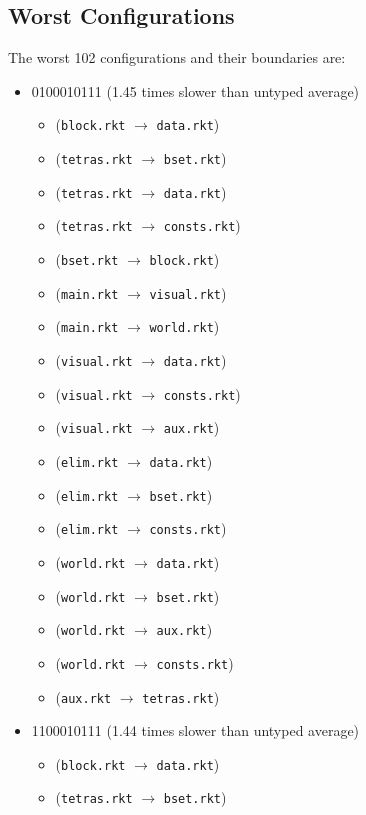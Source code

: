 \documentclass{article}
\newcommand{\mono}[1]{\texttt{#1}}
\begin{document}
\subsection{Worst Configurations}
The worst 102 configurations and their boundaries are:
\begin{itemize}
\item 0100010111 (1.45 times slower than untyped average)
  \begin{itemize}
  \item (\mono{block.rkt} $\rightarrow$ \mono{data.rkt})
  \item (\mono{tetras.rkt} $\rightarrow$ \mono{bset.rkt})
  \item (\mono{tetras.rkt} $\rightarrow$ \mono{data.rkt})
  \item (\mono{tetras.rkt} $\rightarrow$ \mono{consts.rkt})
  \item (\mono{bset.rkt} $\rightarrow$ \mono{block.rkt})
  \item (\mono{main.rkt} $\rightarrow$ \mono{visual.rkt})
  \item (\mono{main.rkt} $\rightarrow$ \mono{world.rkt})
  \item (\mono{visual.rkt} $\rightarrow$ \mono{data.rkt})
  \item (\mono{visual.rkt} $\rightarrow$ \mono{consts.rkt})
  \item (\mono{visual.rkt} $\rightarrow$ \mono{aux.rkt})
  \item (\mono{elim.rkt} $\rightarrow$ \mono{data.rkt})
  \item (\mono{elim.rkt} $\rightarrow$ \mono{bset.rkt})
  \item (\mono{elim.rkt} $\rightarrow$ \mono{consts.rkt})
  \item (\mono{world.rkt} $\rightarrow$ \mono{data.rkt})
  \item (\mono{world.rkt} $\rightarrow$ \mono{bset.rkt})
  \item (\mono{world.rkt} $\rightarrow$ \mono{aux.rkt})
  \item (\mono{world.rkt} $\rightarrow$ \mono{consts.rkt})
  \item (\mono{aux.rkt} $\rightarrow$ \mono{tetras.rkt})
  \end{itemize}
\item 1100010111 (1.44 times slower than untyped average)
  \begin{itemize}
  \item (\mono{block.rkt} $\rightarrow$ \mono{data.rkt})
  \item (\mono{tetras.rkt} $\rightarrow$ \mono{bset.rkt})

\end{itemize}
\end{itemize}
\end{document}
